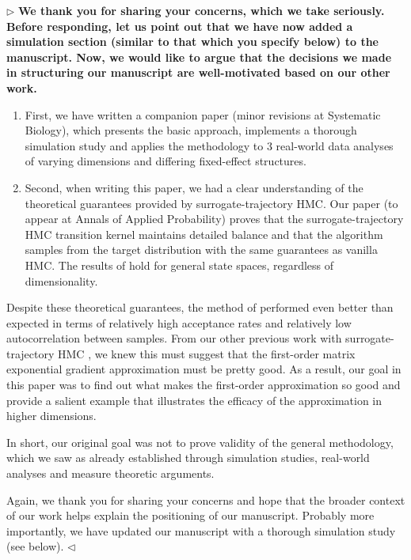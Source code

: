 \documentclass[12pt]{article}
\newenvironment{reply}{$\triangleright$\bfseries}{$\triangleleft$}
\begin{document}
\begin{reply}
	We thank you for sharing your concerns, which we take seriously.  Before responding, let us point out that we have now added a simulation section (similar to that which you specify below) to the manuscript.   Now, we would like to argue that the decisions we made in structuring our manuscript are well-motivated based on our other work.
	\begin{enumerate}
		\item First, we have written a companion paper \citet{magee2023random} (minor revisions at Systematic Biology), which presents the basic approach, implements a thorough simulation study and applies the methodology to 3 real-world data analyses of varying dimensions and differing fixed-effect structures. 
		
		\item Second, when writing this paper, we had a clear understanding of the theoretical guarantees provided by surrogate-trajectory HMC.  Our paper \citet{glatt2020accept} (to appear at Annals of Applied Probability) proves that the surrogate-trajectory HMC transition kernel maintains detailed balance and that the algorithm samples from the target distribution with the same guarantees as vanilla HMC.  The results of \citet{glatt2020accept} hold for general state spaces, regardless of dimensionality.
	\end{enumerate}

Despite these theoretical guarantees, the method of \citet{magee2023random} performed even better than expected in terms of relatively high acceptance rates and relatively low autocorrelation between samples.  From our other previous work with surrogate-trajectory HMC \citep{li2019neural}, we knew this must suggest that the first-order matrix exponential gradient approximation must be pretty good.   
As a result, our goal in this paper was to find out what makes the first-order approximation so good and provide a salient example that illustrates the efficacy of the approximation in higher dimensions.  

In short, our original goal was not to prove validity of the general methodology, which we saw as already established through simulation studies, real-world analyses and measure theoretic arguments.   

Again, we thank you for sharing your concerns and hope that the broader context of our work helps explain the positioning of our manuscript.  Probably more importantly, we have updated our manuscript with a thorough simulation study (see below).
\end{reply}
\end{document}
